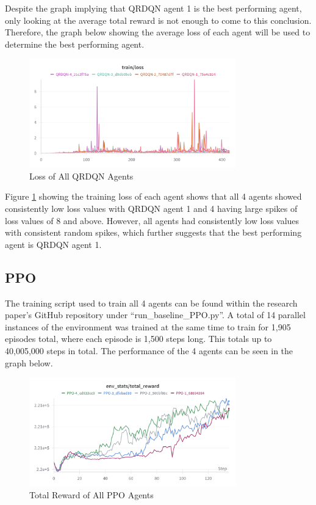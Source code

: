 Despite the graph implying that QRDQN agent 1 is the best performing agent, only looking at the average total reward is not enough to come to this conclusion. Therefore, the graph below showing the average loss of each agent will be used to determine the best performing agent.

\begin{figure}[H]
    \centering
    \includegraphics[width=0.8\textwidth]{figures/QRDQN_Loss.png}
    \caption{Loss of All QRDQN Agents}
    \label{fig:agent_eval_all_qrdqn_loss}
\end{figure}

Figure \ref{fig:agent_eval_all_qrdqn_loss} showing the training loss of each agent shows that all 4 agents showed consistently low loss values with QRDQN agent 1 and 4 having large spikes of loss values of 8 and above. However, all agents had consistently low loss values with consistent random spikes, which further suggests that the best performing agent is QRDQN agent 1.

\subsection{PPO}

The training script used to train all 4 agents can be found within the research paper's GitHub repository under ``run\_baseline\_PPO.py''. A total of 14 parallel instances of the environment was trained at the same time to train for 1,905 episodes total, where each episode is 1,500 steps long. This totals up to 40,005,000 steps in total. The performance of the 4 agents can be seen in the graph below. 

\begin{figure}[H]
    \centering
    \includegraphics[width=0.8\textwidth]{figures/PPO_TotalReward.png}
    \caption{Total Reward of All PPO Agents}
    \label{fig:agent_eval_all_ppo}
\end{figure}

